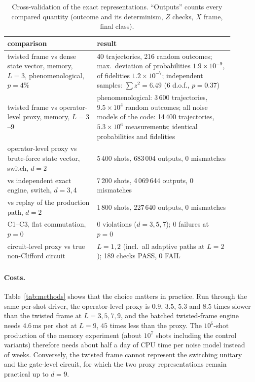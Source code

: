 \documentclass[a4paper]{article}
\begin{document}
\begin{table}[t]
\centering
\caption{Cross-validation of the exact representations. ``Outputs'' counts every compared quantity (outcome and its determinism, $Z$ checks, $X$ frame, final class).}
\label{tab:validation}
\small
\renewcommand{\arraystretch}{1.1}
\begin{tabular}{p{0.36\linewidth}p{0.55\linewidth}}
\toprule
comparison & result \\
\midrule
twisted frame vs dense state vector, memory, $L=3$, phenomenological, $p=4\%$ & 40 trajectories, 216 random outcomes; max.\ deviation of probabilities $1.9\times10^{-9}$, of fidelities $1.2\times10^{-7}$; independent samples: $\sum z^2=6.49$ (6 d.o.f., $p=0.37$) \\
twisted frame vs operator-level proxy, memory, $L=3$--$9$ & phenomenological: 3\,600 trajectories, $9.5\times10^4$ random outcomes; all noise models of the code: 14\,400 trajectories, $5.3\times10^6$ measurements; identical probabilities and fidelities \\
operator-level proxy vs brute-force state vector, switch, $d=2$ & 5\,400 shots, 683\,004 outputs, 0 mismatches \\
vs independent exact engine, switch, $d=3,4$ & 7\,200 shots, 4\,069\,644 outputs, 0 mismatches \\
vs replay of the production path, $d=2$ & 1\,800 shots, 227\,640 outputs, 0 mismatches \\
C1--C3, flat commutation, $p=0$ & 0 violations ($d=3,5,7$); 0 failures at $p=0$ \\
circuit-level proxy vs true non-Clifford circuit & $L=1,2$ (incl.\ all adaptive paths at $L=2$); 189 checks PASS, 0 FAIL \\
\bottomrule
\end{tabular}
\end{table}

\paragraph{Costs.}
Table~\ref{tab:methods} shows that the choice matters in practice. Run through the same per-shot driver, the operator-level proxy is $0.9$, $3.5$, $5.3$ and $8.5$ times slower than the twisted frame at $L=3,5,7,9$, and the batched twisted-frame engine needs $4.6$\,ms per shot at $L=9$, $45$ times less than the proxy. The $10^5$-shot production of the memory experiment (about $10^7$ shots including the control variants) therefore needs about half a day of CPU time per noise model instead of weeks. Conversely, the twisted frame cannot represent the switching unitary and the gate-level circuit, for which the two proxy representations remain practical up to $d=9$.
\end{document}
